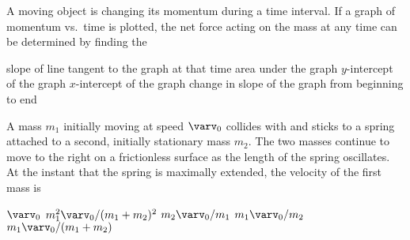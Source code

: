 \documentclass{../../oss-classkick-exam}
\begin{document}
\begin{multicols*}{2}
\begin{questions}
%
%
%    
    \columnbreak
    
    \question A moving object is changing its momentum during a time interval.
    If a graph of momentum vs.\ time is plotted, the net force acting on the
    mass at any time can be determined by finding the
    \begin{choices}
      \choice slope of line tangent to the graph at that time
      \choice area under the graph
      \choice $y$-intercept of the graph
      \choice $x$-intercept of the graph
      \choice change in slope of the graph from beginning to end
    \end{choices}
    \vspace{.7in}
    
    \question A mass $m_1$ initially moving at speed $\varv_0$ collides with and
    sticks to a spring attached to a second, initially stationary mass $m_2$.
    The two masses continue to move to the right on a frictionless surface as
    the length of the spring oscillates. At the instant that the spring is
    maximally extended, the velocity of the first mass is
    \begin{center}
    \end{center}
    \begin{choices}
      \choice $\varv_0$
      \choice $m_1^2\varv_0/(m_1+m_2)^2$
      \choice $m_2\varv_0/m_1$
      \choice $m_1\varv_0/m_2$
      \choice $m_1\varv_0/(m_1+m_2)$
    \end{choices}
  \end{questions}
\end{multicols*}
\end{document}
